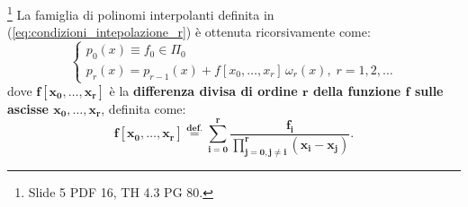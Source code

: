 \begin{theorem}\label{th:formaNewt}\footnote{Slide 5 PDF 16, TH 4.3 PG 80.}
    La famiglia di polinomi interpolanti definita in (\ref{eq:condizioni_intepolazione_r}) è ottenuta ricorsivamente come: 
    \begin{equation}\label{eq:famiglia_polinomi_interpolanti}
    \begin{cases}
        p_0(x)\equiv f_0\in\Pi_0\\
        p_r(x) = p_{r-1}(x)+ f[x_0,\hdots, x_r]\,\omega_r(x),\; r=1,2,\hdots
    \end{cases}
    \end{equation}
    dove $\boldsymbol{f[x_0, \hdots, x_r]}$ è la \textbf{differenza divisa di ordine $\boldsymbol r$ della funzione $\boldsymbol f$ sulle ascisse $\boldsymbol{x_0, \hdots, x_r}$}, definita come:
    \begin{equation}\label{eq:differenza_divisa}
       \boldsymbol{f[x_0, \hdots, x_r] \overset{\text{def.}}{=} \sum_{i=0}^r\frac{f_i}{\prod_{j=0, j\neq i}^{r}(x_i-x_j)}}.
    \end{equation}
\end{theorem}

